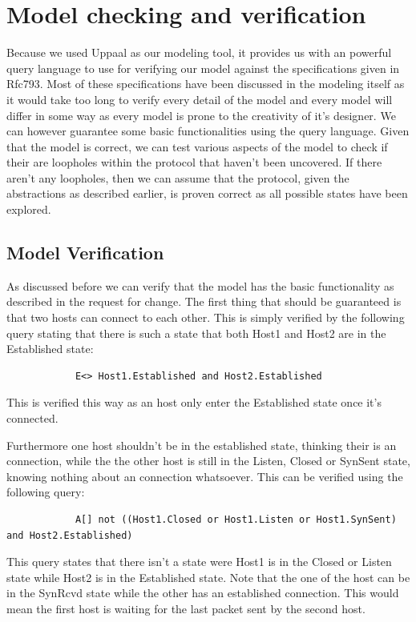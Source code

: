 \documentclass[twocolumn]{article}
\begin{document}
\section{Model checking and verification} %
\label{sec:model_checking_and_verification}
	Because we used Uppaal as our modeling tool, it provides us with an powerful query language to use for verifying our model against the specifications given in Rfc793. Most of these specifications have been discussed in the modeling itself as it would take too long to verify every detail of the model and every model will differ in some way as every model is prone to the creativity of it's designer. We can however guarantee some basic functionalities using the query language. Given that the model is correct, we can test various aspects of the model to check if their are loopholes within the protocol that haven't been uncovered. If there aren't any loopholes, then we can assume that the protocol, given the abstractions as described earlier, is proven correct as all possible states have been explored.
	\subsection{Model Verification} %
	\label{sub:model_verification}
		As discussed before we can verify that the model has the basic functionality as described in the request for change. The first thing that should be guaranteed is that two hosts can connect to each other. This is simply verified by the following query stating that there is such a state that both Host1 and Host2 are in the Established state:
		\begin{verbatim}
			E<> Host1.Established and Host2.Established
		\end{verbatim}
		This is verified this way as an host only enter the Established state once it's connected.

		Furthermore one host shouldn't be in the established state, thinking their is an connection, while the the other host is still in the Listen, Closed or SynSent state, knowing nothing about an connection whatsoever. This can be verified using the following query:
		\begin{verbatim}
			A[] not ((Host1.Closed or Host1.Listen or Host1.SynSent) and Host2.Established)
		\end{verbatim}
		This query states that there isn't a state were Host1 is in the Closed or Listen state while Host2 is in the Established state. Note that the one of the host can be in the SynRcvd state while the other has an established connection. This would mean the first host is waiting for the last packet sent by the second host.
\end{document}
